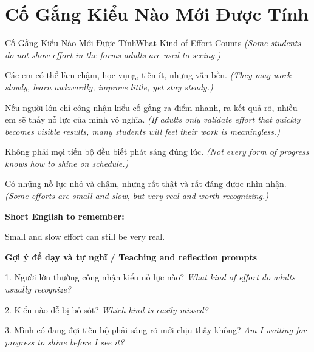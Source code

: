 \section{Cố Gắng Kiểu Nào Mới Được Tính}
\begin{truyen}{Cố Gắng Kiểu Nào Mới Được Tính}{What Kind of Effort Counts}
\textit{(Some students do not show effort in the forms adults are used to seeing.)}

Các em có thể làm chậm, học vụng, tiến ít, nhưng vẫn bền.
\textit{(They may work slowly, learn awkwardly, improve little, yet stay steady.)}

Nếu người lớn chỉ công nhận kiểu cố gắng ra điểm nhanh, ra kết quả rõ, nhiều em sẽ thấy nỗ lực của mình vô nghĩa.
\textit{(If adults only validate effort that quickly becomes visible results, many students will feel their work is meaningless.)}

Không phải mọi tiến bộ đều biết phát sáng đúng lúc.
\textit{(Not every form of progress knows how to shine on schedule.)}

\end{truyen}

\begin{baihoc}
Có những nỗ lực nhỏ và chậm, nhưng rất thật và rất đáng được nhìn nhận.
\textit{(Some efforts are small and slow, but very real and worth recognizing.)}
\end{baihoc}

\begin{ghinhoanh}
\textbf{Short English to remember:}

Small and slow effort can still be very real.

\end{ghinhoanh}

\begin{tuhocnhanh}
\textbf{Gợi ý để dạy và tự nghĩ / Teaching and reflection prompts}

1. Người lớn thường công nhận kiểu nỗ lực nào? \textit{What kind of effort do adults usually recognize?}

2. Kiểu nào dễ bị bỏ sót? \textit{Which kind is easily missed?}

3. Mình có đang đợi tiến bộ phải sáng rõ mới chịu thấy không? \textit{Am I waiting for progress to shine before I see it?}
\end{tuhocnhanh}
\ngancach

